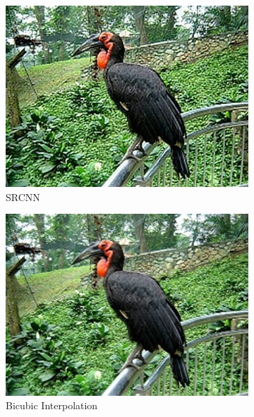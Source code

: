 \documentclass[10pt,twocolumn,letterpaper]{article}
\begin{document}
\begin{figure}[h]
\begin{subfigure}{0.18\textwidth}
        \includegraphics[width=1\linewidth]{000057-sr.jpg}
        \caption{SRCNN}
        \label{fig:subim3}
    \end{subfigure}
    \begin{subfigure}{0.18\textwidth}
        \includegraphics[width=1\linewidth]{000057-bi.jpg}
        \caption{Bicubic Interpolation}
        \label{fig:subim4}
    \end{subfigure}
    \begin{subfigure}{0.18\textwidth}

\end{subfigure}
\end{figure}
\end{document}
